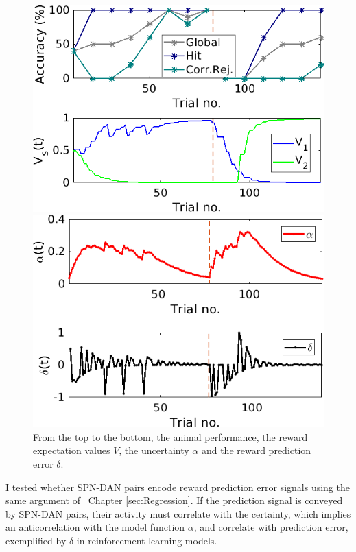 \begin{figure}
    \centering
    \includegraphics[scale=0.7]{figures/PavPerfV.png}
    
    \vspace{0.5cm}
    
    \includegraphics[scale=0.7]{figures/PavAlphaDelta.png}
    \caption{From the top to the bottom, the animal performance, the reward expectation values $V$, the uncertainty $\alpha$ and the reward prediction error $\delta$.}
    \label{fig:PavRL_ex}
\end{figure}
I tested whether SPN-DAN pairs encode reward prediction error signals using the same argument of \hyperref[sec:Regression]{~Chapter \ref*{sec:Regression}}. If the prediction signal is conveyed by SPN-DAN pairs, their activity must correlate with the certainty, which implies an anticorrelation with the model function $\alpha$, and correlate with prediction error, exemplified by $\delta$ in reinforcement learning models.\\

